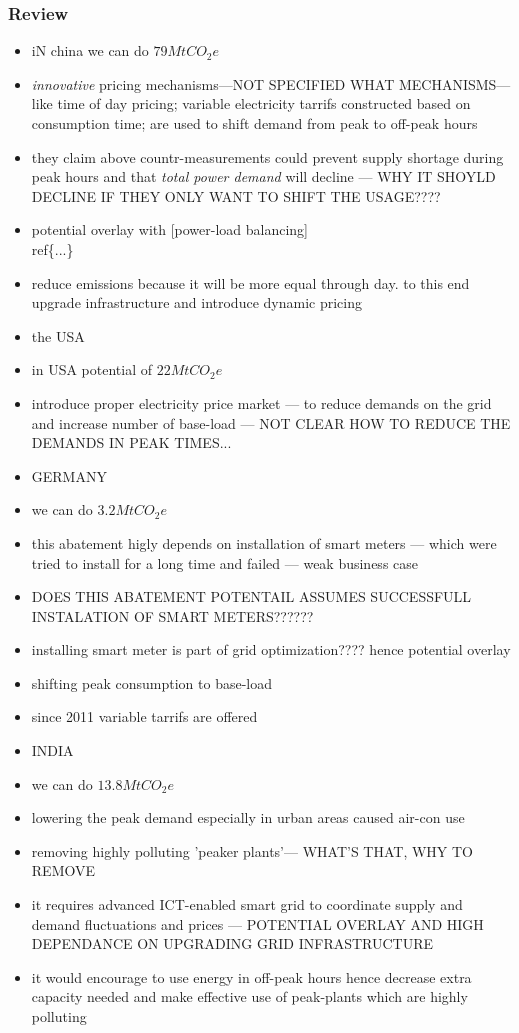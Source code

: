 \documentclass[11pt, twocolumn]{article}
\begin{document}
\subsubsection{Review}
\begin{itemize}
\item iN china we can do $79 Mt CO_2e$
\item \emph{innovative} pricing mechanisms---NOT SPECIFIED WHAT MECHANISMS--- like time of day pricing; variable electricity tarrifs constructed based on consumption time; are used to shift demand from peak to off-peak hours
\item they claim above countr-measurements could prevent supply shortage during peak hours and that \emph{total power demand} will decline --- WHY IT SHOYLD DECLINE IF THEY ONLY WANT TO SHIFT THE USAGE????
\item potential overlay with  [power-load balancing]\\ref\{...\}
\item reduce emissions because it will be more equal through day. to this end upgrade infrastructure and introduce dynamic pricing


\item the USA
\item in USA potential of $22 MtCO_2e$
\item introduce proper electricity price market --- to reduce demands on the grid and increase number of base-load --- NOT CLEAR HOW TO REDUCE THE DEMANDS IN PEAK TIMES...

\item GERMANY
\item we can do $3.2 Mt CO_2e$
\item this abatement higly depends on installation of smart meters --- which were tried to install for a long time and failed --- weak business case
\item DOES THIS ABATEMENT POTENTAIL ASSUMES SUCCESSFULL INSTALATION OF SMART METERS??????
\item installing smart meter is part of grid optimization???? hence potential overlay

\item shifting peak consumption to base-load
\item since 2011 variable tarrifs are offered


\item INDIA
\item we can do $13.8 Mt CO_2e$
\item lowering the peak demand especially in urban areas caused air-con use
\item removing highly polluting 'peaker plants'--- WHAT'S THAT, WHY TO REMOVE
\item it requires advanced ICT-enabled smart grid to coordinate supply and demand fluctuations and prices --- POTENTIAL OVERLAY AND HIGH DEPENDANCE ON UPGRADING GRID INFRASTRUCTURE
\item it would encourage to use energy in off-peak hours hence decrease extra capacity needed and make effective use of peak-plants which are highly polluting


\end{itemize}
\end{document}

